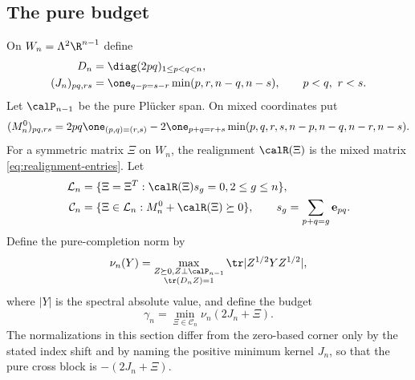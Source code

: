 \subsection{The pure budget}
On $W_n=\Lambda^2\R^{n-1}$ define
\begin{equation}\label{eq:budget-baseline}
 \begin{split}
 D_n&=\diag(2pq)_{1\le p<q<n},\\
 (J_n)_{pq,rs}&=\one_{q-p=s-r}\min(p,r,n-q,n-s),\qquad p<q,\ r<s.
 \end{split}
\end{equation}
Let $\calP_{n-1}$ be the pure Pl\"ucker span. On mixed coordinates put
\begin{equation}\label{eq:budget-mixed}
 (M_n^0)_{pq,rs}=2pq\one_{(p,q)=(r,s)}
 -2\one_{p+q=r+s}\min(p,q,r,s,n-p,n-q,n-r,n-s).
\end{equation}
For a symmetric matrix $\Xi$ on $W_n$, the realignment $\calR(\Xi)$ is
the mixed matrix \eqref{eq:realignment-entries}. Let
\begin{equation}\label{eq:exchange-set}
 \begin{split}
 \mathcal L_n&=\{\Xi=\Xi^T:\calR(\Xi)s_g=0, 2\le g\le n\},\\
 \mathcal C_n&=\{\Xi\in\mathcal L_n:M_n^0+\calR(\Xi)\succeq0\},
 \qquad s_g=\sum_{p+q=g}\mathbf e_{pq}.
 \end{split}
\end{equation}
Define the pure-completion norm by
\begin{equation}\label{eq:pure-norm}
 \nu_n(Y)=\max_{\substack{Z\succeq0, Z\perp\calP_{n-1}\\
                         \tr(D_nZ)=1}}
                  \tr|Z^{1/2}YZ^{1/2}|,
\end{equation}
where $|Y|$ is the spectral absolute value, and define the budget
\begin{equation}\label{eq:gamma}
                       \gamma_n=\min_{\Xi\in\mathcal C_n}\nu_n(2J_n+\Xi).
\end{equation}
The normalizations in this section differ from the zero-based corner
only by the stated index shift and by naming the positive minimum
kernel $J_n$, so that the pure cross block is $-(2J_n+\Xi)$.

